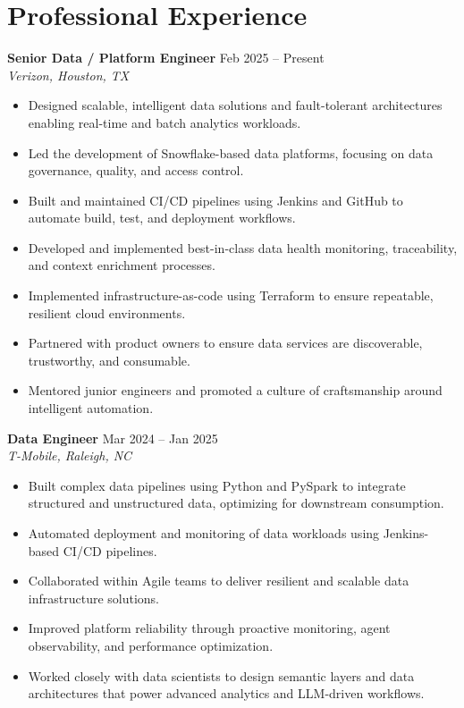 \documentclass[10pt]{article} %
\begin{document}
\section*{Professional Experience}

\textbf{Senior Data / Platform Engineer} \hfill Feb 2025 -- Present \\ %
\textit{Verizon, Houston, TX}
\begin{itemize}[leftmargin=*, itemsep=3pt]
    \item Designed scalable, intelligent data solutions and fault-tolerant architectures enabling real-time and batch analytics workloads. %
    \item Led the development of Snowflake-based data platforms, focusing on data governance, quality, and access control. %
    \item Built and maintained CI/CD pipelines using Jenkins and GitHub to automate build, test, and deployment workflows. %
    \item Developed and implemented best-in-class data health monitoring, traceability, and context enrichment processes.
    \item Implemented infrastructure-as-code using Terraform to ensure repeatable, resilient cloud environments. %
    \item Partnered with product owners to ensure data services are discoverable, trustworthy, and consumable. %
    \item Mentored junior engineers and promoted a culture of craftsmanship around intelligent automation. %
\end{itemize}

\textbf{Data Engineer} \hfill Mar 2024 -- Jan 2025 \\ %
\textit{T-Mobile, Raleigh, NC}
\begin{itemize}[leftmargin=*, itemsep=3pt]
    \item Built complex data pipelines using Python and PySpark to integrate structured and unstructured data, optimizing for downstream consumption. %
    \item Automated deployment and monitoring of data workloads using Jenkins-based CI/CD pipelines. %
    \item Collaborated within Agile teams to deliver resilient and scalable data infrastructure solutions. %
    \item Improved platform reliability through proactive monitoring, agent observability, and performance optimization. %
    \item Worked closely with data scientists to design semantic layers and data architectures that power advanced analytics and LLM-driven workflows. %
\end{itemize}
\end{document}

